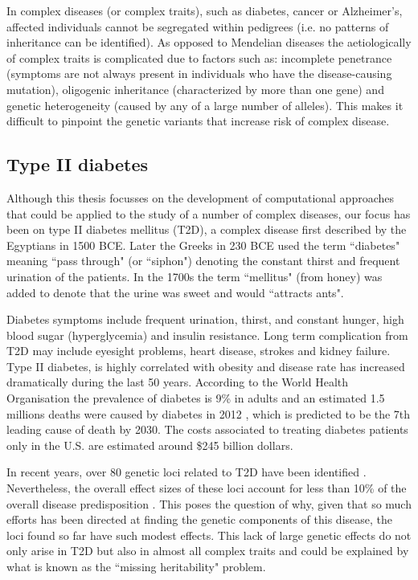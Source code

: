 In complex diseases (or complex traits), such as diabetes, cancer or Alzheimer’s, affected individuals cannot be segregated within pedigrees (i.e. no patterns of inheritance can be identified). As opposed to Mendelian diseases the aetiologically of complex traits is complicated due to factors such as: incomplete penetrance (symptoms are not always present in individuals who have the disease-causing mutation), oligogenic inheritance (characterized by more than one gene) and genetic heterogeneity (caused by any of a large number of alleles). This makes  it difficult to pinpoint the genetic variants that increase risk of complex disease.

\subsection{Type II diabetes}

Although this thesis focusses on the development of computational approaches that could be applied to the study of a number of complex diseases, our focus has been on type II diabetes mellitus (T2D), a complex disease first described by the Egyptians in 1500 BCE. Later the Greeks in 230 BCE used the term ``diabetes" meaning ``pass through" (or ``siphon") denoting the constant thirst and frequent urination of the patients. In the 1700s the term ``mellitus" (from honey) was added to denote that the urine was sweet and would ``attracts ants".

Diabetes symptoms include frequent urination, thirst, and constant hunger, high blood sugar (hyperglycemia) and insulin resistance. Long term complication from T2D may include eyesight problems, heart disease, strokes and kidney failure. Type II diabetes, is highly correlated with obesity and disease rate has increased dramatically during the last 50 years. According to the World Health Organisation the prevalence of diabetes is 9\% in adults and an estimated 1.5 millions deaths were caused by diabetes in 2012 \cite{guariguata2014global}, which is predicted to be the 7th leading cause of death by 2030. The costs associated to treating diabetes patients only in the U.S. are estimated around \$245 billion dollars.

In recent years, over 80 genetic loci related to T2D have been identified \cite{morris2012large, consortium2014genome}. Nevertheless, the overall effect sizes of these loci account for less than 10\% of the overall disease predisposition \cite{manolio2009finding}. This poses the question of why, given that so much efforts has been directed at finding the genetic components of this disease, the loci found so far have such modest effects. This lack of large genetic effects do not only arise in T2D but also in almost all complex traits and could be explained by what is known as the ``missing heritability" problem.

